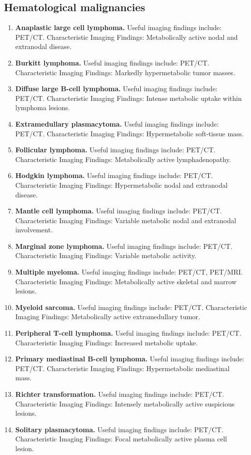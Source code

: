 \subsection{Hematological malignancies}
\begin{enumerate}[leftmargin=*,itemsep=0.45em,topsep=0.4em]
\item \textbf{Anaplastic large cell lymphoma.} Useful imaging findings include: PET/CT. Characteristic Imaging Findings: Metabolically active nodal and extranodal disease.
\item \textbf{Burkitt lymphoma.} Useful imaging findings include: PET/CT. Characteristic Imaging Findings: Markedly hypermetabolic tumor masses.
\item \textbf{Diffuse large B-cell lymphoma.} Useful imaging findings include: PET/CT. Characteristic Imaging Findings: Intense metabolic uptake within lymphoma lesions.
\item \textbf{Extramedullary plasmacytoma.} Useful imaging findings include: PET/CT. Characteristic Imaging Findings: Hypermetabolic soft-tissue mass.
\item \textbf{Follicular lymphoma.} Useful imaging findings include: PET/CT. Characteristic Imaging Findings: Metabolically active lymphadenopathy.
\item \textbf{Hodgkin lymphoma.} Useful imaging findings include: PET/CT. Characteristic Imaging Findings: Hypermetabolic nodal and extranodal disease.
\item \textbf{Mantle cell lymphoma.} Useful imaging findings include: PET/CT. Characteristic Imaging Findings: Variable metabolic nodal and extranodal involvement.
\item \textbf{Marginal zone lymphoma.} Useful imaging findings include: PET/CT. Characteristic Imaging Findings: Variable metabolic activity.
\item \textbf{Multiple myeloma.} Useful imaging findings include: PET/CT, PET/MRI. Characteristic Imaging Findings: Metabolically active skeletal and marrow lesions.
\item \textbf{Myeloid sarcoma.} Useful imaging findings include: PET/CT. Characteristic Imaging Findings: Metabolically active extramedullary tumor.
\item \textbf{Peripheral T-cell lymphoma.} Useful imaging findings include: PET/CT. Characteristic Imaging Findings: Increased metabolic uptake.
\item \textbf{Primary mediastinal B-cell lymphoma.} Useful imaging findings include: PET/CT. Characteristic Imaging Findings: Hypermetabolic mediastinal mass.
\item \textbf{Richter transformation.} Useful imaging findings include: PET/CT. Characteristic Imaging Findings: Intensely metabolically active suspicious lesions.
\item \textbf{Solitary plasmacytoma.} Useful imaging findings include: PET/CT. Characteristic Imaging Findings: Focal metabolically active plasma cell lesion.
\end{enumerate}

